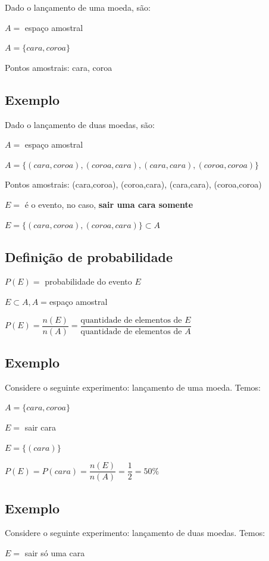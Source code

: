 \documentclass[a4paper]{article}
\begin{document}
	\noindent Dado o lançamento de uma moeda, são:
	
	$A =$ espaço amostral
	
	$A = \{cara,coroa\}$
	
	Pontos amostrais: cara, coroa
	
	\subsection{Exemplo}
	
	\noindent Dado o lançamento de duas moedas, são:
	
	$A =$ espaço amostral
	
	$A = \{(cara,coroa),(coroa,cara),(cara,cara),(coroa,coroa)\}$
	
	Pontos amostrais: (cara,coroa), (coroa,cara), (cara,cara), (coroa,coroa)
	
	$E =$ é o evento, no caso, \textbf{sair uma cara somente}
	
	$E = \{(cara,coroa),(coroa,cara)\} \subset A$
	
	\subsection{Definição de probabilidade}
	
	$P(E) =$ probabilidade do evento $E$
	
	$E \subset A, A = $espaço amostral
	
	$P(E) = \dfrac{n(E)}{n(A)} = \dfrac{\text{quantidade de elementos de $E$}}{\text{quantidade de elementos de $A$}}$
	
	\subsection{Exemplo}
	
	Considere o seguinte experimento: lançamento de uma moeda. Temos:
	
	$A = \{cara,coroa\}$
	
	$E =$ sair cara
	
	$E = \{(cara)\}$
	
	$P(E) = P(cara) = \dfrac{n(E)}{n(A)} = \dfrac{1}{2} = 50\%$
	
	\subsection{Exemplo}
	
	Considere o seguinte experimento: lançamento de duas moedas. Temos:
	
	$E =$ sair só uma cara
	
\end{document}
